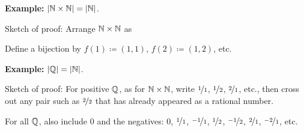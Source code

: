 \documentclass[10pt,aspectratio=169]{beamer}
\begin{document}
\begin{frame}
%
%

\textbf{Example:}
$\left\lvert {{\mathbb{N}}\times {\mathbb{N}}} \right\rvert = \left\lvert {{\mathbb{N}}} \right\rvert$.

\medskip
\pause
Sketch of proof: Arrange 
${\mathbb{N}} \times {\mathbb{N}}$ as


\hspace*{\fill}{NcrossNcard.pdf_t}\hspace*{\fill}

\pause

Define a bijection by $f(1) \coloneqq (1,1)$, $f(2) \coloneqq (1,2)$, etc.

\medskip
\pause




\textbf{Example:}
$\left\lvert {{\mathbb{Q}}} \right\rvert=\left\lvert {{\mathbb{N}}} \right\rvert$.

\medskip
\pause
Sketch of proof:
For positive ${\mathbb{Q}}$,
as for ${\mathbb{N}} \times {\mathbb{N}}$, write
$\nicefrac{1}{1}$, $\nicefrac{1}{2}$, $\nicefrac{2}{1}$, etc.,
then cross out any pair such as $\nicefrac{2}{2}$ that
has already appeared as a rational number.

\pause
For all ${\mathbb{Q}}$, also include $0$ and the negatives:
$0$,
$\nicefrac{1}{1}$,
$\nicefrac{-1}{1}$,
$\nicefrac{1}{2}$,
$\nicefrac{-1}{2}$,
$\nicefrac{2}{1}$,
$\nicefrac{-2}{1}$,
etc.

%
%
%
%
%
%
%
%
%
%
\end{frame}
\end{document}
